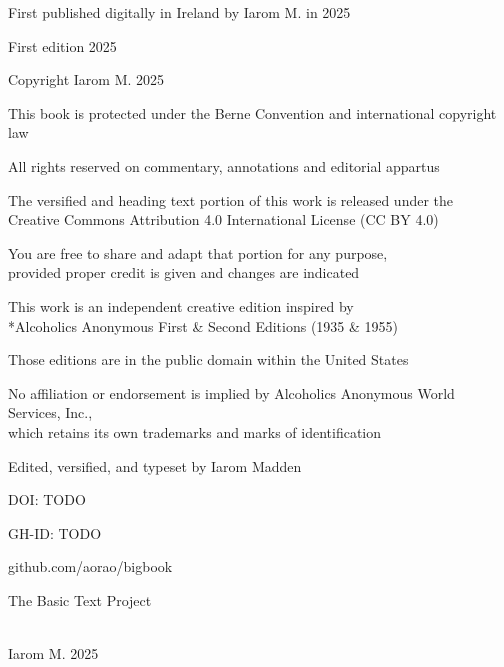\begin{legalchapter}

First published digitally in Ireland by Iarom M. in 2025

First edition 2025

Copyright \textcopyright Iarom M. 2025

This book is protected under the Berne Convention and international copyright law

All rights reserved on commentary, annotations and editorial appartus

The versified and heading text portion of this work is released under the \\
Creative Commons Attribution 4.0 International License (CC BY 4.0)

You are free to share and adapt that portion for any purpose, \\
provided proper credit is given and changes are indicated

This work is an independent creative edition inspired by \\
*Alcoholics Anonymous First \& Second Editions (1935 \& 1955)

Those editions are in the public domain within the United States

No affiliation or endorsement is implied by Alcoholics Anonymous World Services, Inc., \\
which retains its own trademarks and marks of identification

Edited, versified, and typeset by Iarom Madden

DOI: TODO

GH-ID: TODO

github.com/aorao/bigbook

The Basic Text Project


\vfill
\bbtitle \\
\textcopyright Iarom M. 2025

\end{legalchapter}
